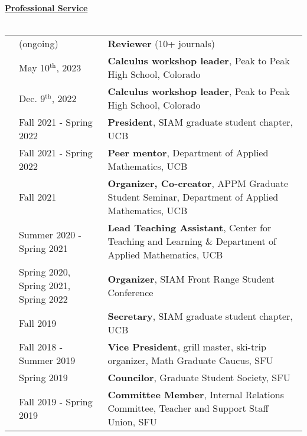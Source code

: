 \documentclass[letterpaper,11pt,oneside]{article}
\newcommand{\headr}[1]{\vspace{10pt}\uline{\Large{\textbf{#1}} \hfill } \\ \vspace{-10pt}\\}
\begin{document}
\headr{Professional Service}
\begin{tabular}{p{0.01cm} p{4.5cm} p{12cm}}
& (ongoing) & {\bf Reviewer} (10+ journals)\\
& May 10$^\text{th}$, 2023 & {\bf Calculus workshop leader}, Peak to Peak High School, Colorado \\ 
& Dec. 9$^\text{th}$, 2022 & {\bf Calculus workshop leader}, Peak to Peak High School, Colorado \\ 
& Fall 2021 - Spring 2022 & \textbf{President}, SIAM graduate student chapter, UCB\\
& Fall 2021 - Spring 2022  & \textbf{Peer mentor}, Department of Applied Mathematics, UCB\\
& Fall 2021  & \textbf{Organizer, Co-creator}, APPM Graduate Student Seminar, Department of Applied Mathematics, UCB\\
& Summer 2020 - Spring 2021 & \textbf{Lead Teaching Assistant}, Center for Teaching and Learning \& Department of Applied Mathematics, UCB\\
& Spring 2020, Spring 2021, Spring 2022  & \textbf{Organizer}, SIAM Front Range Student Conference \\
& Fall 2019  & \textbf{Secretary}, SIAM graduate student chapter, UCB\\
& Fall 2018 - Summer 2019 & \textbf{Vice President}, grill master, ski-trip organizer, Math Graduate Caucus, SFU\\
& Spring 2019 & \textbf{Councilor}, Graduate Student Society, SFU\\
& Fall 2019 - Spring 2019 & \textbf{Committee Member}, Internal Relations Committee, Teacher and Support Staff Union, SFU \\
\end{tabular}






\end{document}
